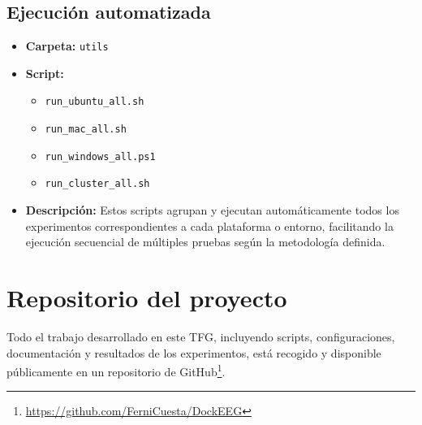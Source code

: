 \subsection{Ejecución automatizada}
\begin{itemize}
    \item \textbf{Carpeta:} \texttt{utils}
    \item \textbf{Script:}
          \begin{itemize}
              \item \texttt{run\_ubuntu\_all.sh}
              \item \texttt{run\_mac\_all.sh}
              \item \texttt{run\_windows\_all.ps1}
              \item \texttt{run\_cluster\_all.sh}
          \end{itemize}
    \item \textbf{Descripción:} Estos scripts agrupan y ejecutan automáticamente todos los experimentos correspondientes a cada plataforma o entorno, facilitando la ejecución secuencial de múltiples pruebas según la metodología definida.
\end{itemize}

\section{Repositorio del proyecto}\label{sec:repositorio}

Todo el trabajo desarrollado en este TFG, incluyendo scripts, configuraciones, documentación y resultados de los experimentos, está recogido y disponible públicamente en un repositorio de GitHub\footnote{\url{https://github.com/FerniCuesta/DockEEG}}.
